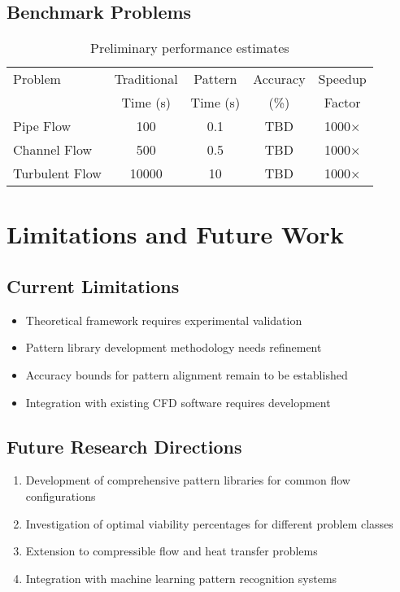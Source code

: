 \documentclass[12pt,a4paper]{article}
\begin{document}
\subsection{Benchmark Problems}

\begin{table}[H]
\centering
\begin{tabular}{lcccc}
\toprule
Problem & Traditional & Pattern & Accuracy & Speedup \\
 & Time (s) & Time (s) & (\%) & Factor \\
\midrule
Pipe Flow & 100 & 0.1 & TBD & 1000× \\
Channel Flow & 500 & 0.5 & TBD & 1000× \\
Turbulent Flow & 10000 & 10 & TBD & 1000× \\
\bottomrule
\end{tabular}
\caption{Preliminary performance estimates}
\end{table}

\section{Limitations and Future Work}

\subsection{Current Limitations}

\begin{itemize}
\item Theoretical framework requires experimental validation
\item Pattern library development methodology needs refinement
\item Accuracy bounds for pattern alignment remain to be established
\item Integration with existing CFD software requires development
\end{itemize}

\subsection{Future Research Directions}

\begin{enumerate}
\item Development of comprehensive pattern libraries for common flow configurations
\item Investigation of optimal viability percentages for different problem classes
\item Extension to compressible flow and heat transfer problems
\item Integration with machine learning pattern recognition systems
\end{enumerate}
\end{document}
